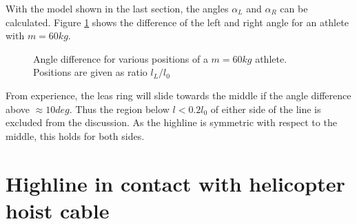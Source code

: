 \documentclass[a4paper,10pt]{scrartcl}
\begin{document}
With the model shown in the last section, the angles $\alpha_L$ and $\alpha_R$ can be calculated. Figure \ref{fig::2d::alpha_L} shows the difference of the left and right angle for an athlete with $m=60kg$.

\begin{figure}[ht]
\centering
{}
\caption{Angle difference for various positions of a $m=60kg$ athlete. Positions are given as ratio $l_L / l_0$}
\label{fig::2d::alpha_L}
\end{figure}

From experience, the leas ring will slide towards the middle if the angle difference  above $\approx 10 deg$. Thus the region below $l < 0.2 l_0$ of either side of the line is excluded from the discussion. As the highline is symmetric with respect to the middle, this holds for both sides.

\section{Highline in contact with helicopter hoist cable}
\end{document}
